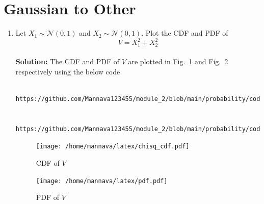 \documentclass[journal,10pt,twocolumn]{IEEEtran}
\newcommand\figref{Fig.~\ref}
\newcommand{\solution}{\noindent \textbf{Solution: }}
\providecommand{\gauss}[2]{\mathcal{N}\ensuremath{\left(#1,#2\right)}}
\begin{document}
\section{Gaussian to Other}
\begin{enumerate}
\item
Let $X_1 \sim  \gauss{0}{1}$ and $X_2 \sim  \gauss{0}{1}$. Plot the CDF and PDF of
%
\begin{equation}
V = X_1^2 + X_2^2
\end{equation}\\
\solution The CDF and PDF of $V$ are plotted in \figref{fig:chisq_cdf} and \figref{fig:chisq_pdf} respectively using the below code
\begin{lstlisting}
	https://github.com/Mannava123455/module_2/blob/main/probability/codes/chapter_4/4_1_cdf.py

	https://github.com/Mannava123455/module_2/blob/main/probability/codes/chapter_4/4_1_pdf.py
\end{lstlisting}
\begin{figure}[H]
\centering
\texttt{[image: /home/mannava/latex/chisq\_cdf.pdf]}
\caption{CDF of $V$}
\label{fig:chisq_cdf}
\end{figure}
\begin{figure}[H]
\centering
\texttt{[image: /home/mannava/latex/pdf.pdf]}
\caption{PDF of $V$}
\label{fig:chisq_pdf}
\end{figure}
%


\end{enumerate}
\end{document}
